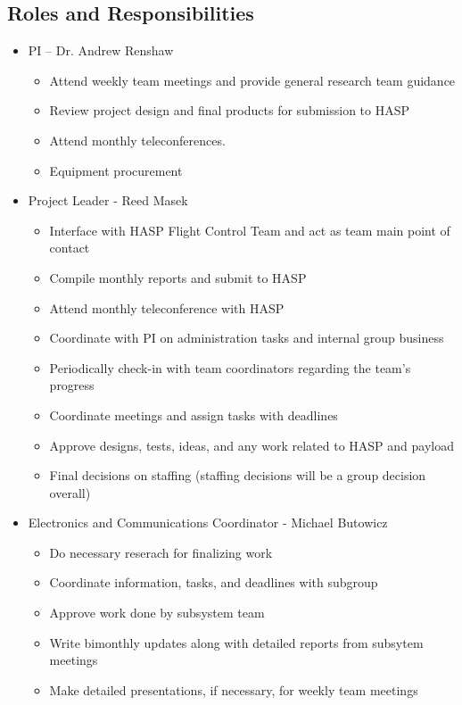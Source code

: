 \subsection{Roles and Responsibilities}
\label{sec:Roles}
\begin{itemize}
\item PI – Dr. Andrew Renshaw
	\begin{itemize}
	\item Attend weekly team meetings and provide general research team guidance
	\item Review project design and final products for submission to HASP
	\item Attend monthly teleconferences.
	\item Equipment procurement
	\end{itemize}
\item Project Leader - Reed Masek
	\begin{itemize}
	\item Interface with HASP Flight Control Team and act as team main point of contact
	\item Compile monthly reports and submit to HASP
	\item Attend monthly teleconference with HASP
	\item Coordinate with PI on administration tasks and internal group business
        \item Periodically check-in with team coordinators regarding the team's progress
        \item Coordinate meetings and assign tasks with deadlines
	\item Approve designs, tests, ideas, and any work related to HASP and payload
	\item Final decisions on staffing (staffing decisions will be a group decision overall)
	\end{itemize}
\item Electronics and Communications Coordinator - Michael Butowicz
	\begin{itemize}
	\item Do necessary reserach for finalizing work
	\item Coordinate information, tasks, and deadlines with subgroup
	\item Approve work done by subsystem team
	\item Write bimonthly updates along with detailed reports from subsytem meetings
	\item Make detailed presentations, if necessary, for weekly team meetings

\end{itemize}
\end{itemize}

